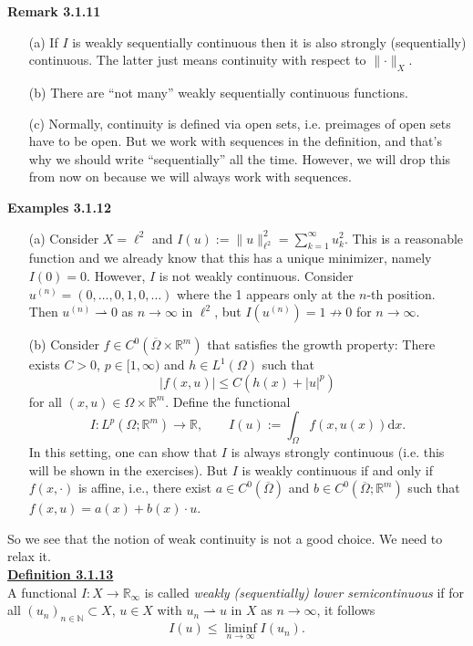 \textbf{Remark 3.1.11}
\begin{itemize}
	\item[(a)] If $I$ is weakly sequentially continuous then it is also strongly (sequentially) continuous. The latter just means continuity with respect to $\lVert\cdot\rVert_X$.
	\item[(b)] There are ``not many'' weakly sequentially continuous functions.
	\item[(c)] Normally, continuity is defined via open sets, i.e. preimages of open sets have to be open. But we work with sequences in the definition, and that's why we should write ``sequentially'' all the time. However, we will drop this from now on because we will always work with sequences.\\[11pt]
\end{itemize}

\hypertarget{examples_3_1_12}{\textbf{Examples 3.1.12}}
\begin{itemize}
	\item[(a)] Consider $X=\ell^2$ and $I(u):=\lVert u\rVert_{\ell^2}^2=\sum_{k=1}^\infty{u_k^2}$. This is a reasonable function and we already know that this has a unique minimizer, namely $I(0)=0$. However, $I$ is not weakly continuous. Consider $u^{(n)}=(0,\dotsc,0,1,0,\dotsc)$ where the 1 appears only at the $n$-th position. Then $u^{(n)}\rightharpoonup0$ as $n\to\infty$ in $\ell^2$, but $I(u^{(n)})=1\not\to0$ for $n\to\infty$.
	\item[(b)] Consider $f\in C^0(\overline{\Omega}\times\mathbb{R}^m)$ that satisfies the growth property: There exists $C>0$, $p\in[1,\infty)$ and $h\in L^1(\Omega)$ such that
	\[\lvert f(x,u)\rvert\leq C(h(x)+\lvert u\rvert^p)\]
	for all $(x,u)\in\Omega\times\mathbb{R}^m$. Define the functional
	\[I:L^p(\Omega;\mathbb{R}^m)\longrightarrow\mathbb{R},\qquad I(u):=\int_\Omega{f(x,u(x))\mathrm{d}x}.\]
	In this setting, one can show that $I$ is always strongly continuous (i.e. this will be shown in the exercises). But $I$ is weakly continuous if and only if $f(x,\cdot)$ is affine, i.e., there exist $a\in C^0(\overline{\Omega})$ and $b\in C^0(\overline{\Omega};\mathbb{R}^m)$ such that $f(x,u)=a(x)+b(x)\cdot u$.\newpage
\end{itemize}

So we see that the notion of weak continuity is not a good choice. We need to relax it.\\[11pt]

\textbf{\underline{Definition 3.1.13}}\\
A functional $I:X\longrightarrow\mathbb{R}_\infty$ is called \textit{weakly (sequentially) lower semicontinuous} if for all $(u_n)_{n\in\mathbb{N}}\subset X$, $u\in X$ with $u_n\rightharpoonup u$ in $X$ as $n\to\infty$, it follows
\[I(u)\leq\liminf_{n\to\infty}{I(u_n)}.\]

